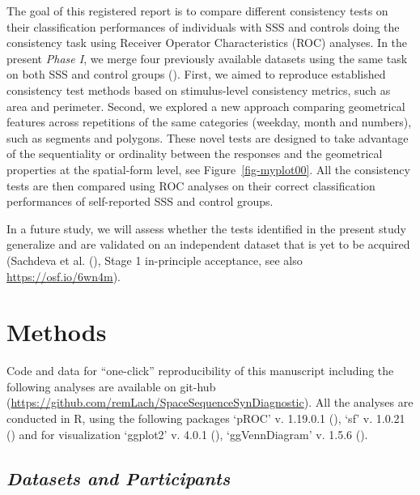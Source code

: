 \documentclass[
  man,
  longtable,
  a4paper,
  nolmodern,
  notxfonts,
  notimes,
  colorlinks=true,linkcolor=blue,citecolor=blue,urlcolor=blue]{apa7}
\begin{document}
The goal of this registered report is to compare different consistency
tests on their classification performances of individuals with SSS and
controls doing the consistency task using Receiver Operator
Characteristics (ROC) analyses. In the present \emph{Phase I}, we merge
four previously available datasets using the same task on both SSS and
control groups (). First, we aimed
to reproduce established consistency test methods based on
stimulus-level consistency metrics, such as area and perimeter. Second,
we explored a new approach comparing geometrical features across
repetitions of the same categories (weekday, month and numbers), such as
segments and polygons. These novel tests are designed to take advantage
of the sequentiality or ordinality between the responses and the
geometrical properties at the spatial-form level, see
Figure~\ref{fig-myplot00}. All the consistency tests are then compared
using ROC analyses on their correct classification performances of
self-reported SSS and control groups.

In a future study, we will assess whether the tests identified in the
present study generalize and are validated on an independent dataset
that is yet to be acquired (Sachdeva et al.
(), Stage 1 in-principle acceptance,
see also \url{https://osf.io/6wn4m}).

\section{Methods}\label{methods}

Code and data for ``one-click'' reproducibility of this manuscript
including the following analyses are available on git-hub
(\url{https://github.com/remLach/SpaceSequenceSynDiagnostic}). All the
analyses are conducted in R, using the following packages `pROC' v.
1.19.0.1 (), `sf' v. 1.0.21
() and for visualization
`ggplot2' v. 4.0.1 (),
`ggVennDiagram' v. 1.5.6 ().

\subsection{\texorpdfstring{\emph{Datasets and
Participants}}{Datasets and Participants}}\label{datasets-and-participants}
\end{document}
